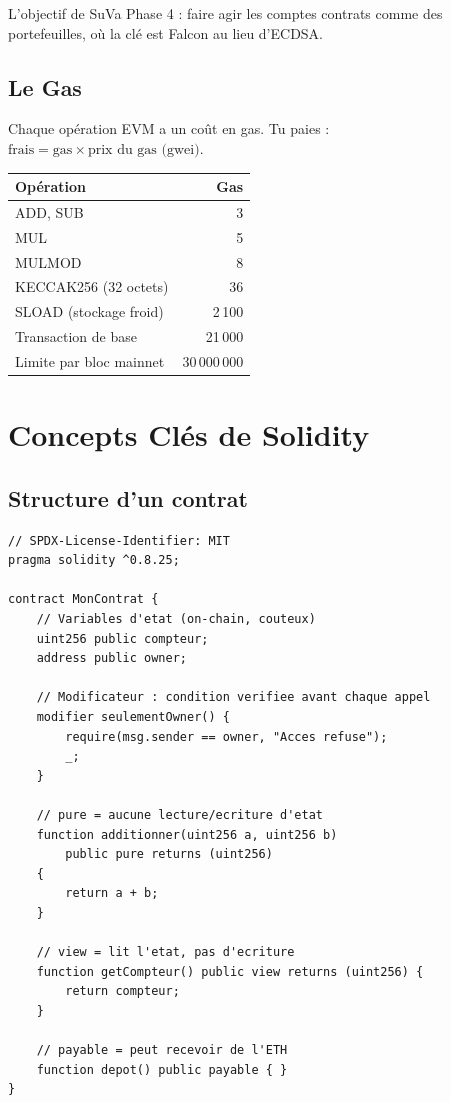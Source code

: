 \documentclass[11pt,a4paper]{article}
\begin{document}
L'objectif de SuVa Phase 4 : faire agir les comptes contrats comme des portefeuilles, où la clé est Falcon au lieu d'ECDSA.

\subsection{Le Gas}

Chaque opération EVM a un coût en gas. Tu paies : $\text{frais} = \text{gas} \times \text{prix du gas (gwei)}$.

\begin{center}
\begin{tabular}{lr}
\toprule
\textbf{Opération} & \textbf{Gas} \\
\midrule
ADD, SUB               & 3 \\
MUL                    & 5 \\
MULMOD                 & 8 \\
KECCAK256 (32 octets)  & 36 \\
SLOAD (stockage froid) & 2\,100 \\
Transaction de base    & 21\,000 \\
Limite par bloc mainnet & 30\,000\,000 \\
\bottomrule
\end{tabular}
\end{center}

\section{Concepts Clés de Solidity}

\subsection{Structure d'un contrat}

\begin{lstlisting}[style=solidity, caption={Éléments clés de Solidity}]
// SPDX-License-Identifier: MIT
pragma solidity ^0.8.25;

contract MonContrat {
    // Variables d'etat (on-chain, couteux)
    uint256 public compteur;
    address public owner;

    // Modificateur : condition verifiee avant chaque appel
    modifier seulementOwner() {
        require(msg.sender == owner, "Acces refuse");
        _;
    }

    // pure = aucune lecture/ecriture d'etat
    function additionner(uint256 a, uint256 b)
        public pure returns (uint256)
    {
        return a + b;
    }

    // view = lit l'etat, pas d'ecriture
    function getCompteur() public view returns (uint256) {
        return compteur;
    }

    // payable = peut recevoir de l'ETH
    function depot() public payable { }
}
\end{lstlisting}
\end{document}
